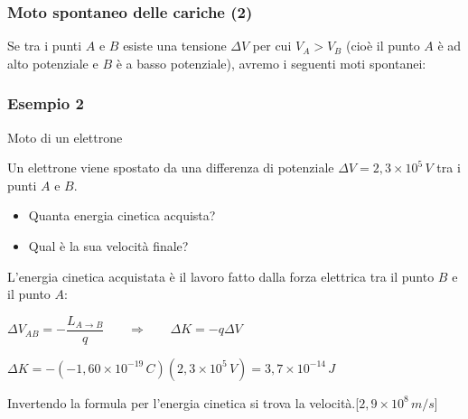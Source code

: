 \documentclass[]{beamer}
\theoremstyle{plain}
\begin{document}
\begin{frame}
\frametitle{Moto spontaneo delle cariche (2)}
Se tra i punti $ A $ e $ B $ esiste una tensione $ \Delta V $ per cui \alert{$ V_A > V_B $} (cioè il punto $ A $ è ad alto potenziale e $ B $ è a basso potenziale), avremo i seguenti moti spontanei:
\begin{figure}
\end{figure}
\end{frame}





\begin{frame}
\frametitle{Esempio 2}

\begin{exampleblock}{Moto di un elettrone}
{\small Un elettrone  viene spostato da una differenza di potenziale $ \Delta V = 2,3 \times 10^5 \, V $ tra i punti $ A $ e $ B $.
\begin{itemize}
  \item Quanta energia cinetica acquista?
  \item Qual è la sua velocità finale?
\end{itemize}}
\end{exampleblock}
\pause
L'energia cinetica acquistata è il lavoro fatto dalla forza elettrica tra il punto $ B $ e il punto $ A $:
\begin{center}
$ \Delta V_{AB} = - \dfrac{L_{A \to B}}{q} $~~~ $ \Longrightarrow  $ ~~~$ \Delta K = -q \Delta V  $\pause

$ \Delta K = - (-1,60 \times 10^{-19} \, C) (2,3 \times 10 ^5 \, V) = 3,7 \times 10^{-14} \, J $
\end{center}\pause
Invertendo la formula per l'energia cinetica si trova la velocità.\hspace*{\fill}[$ 2,9 \times 10^{8} \, m/s $]
\end{frame}
\end{document}

